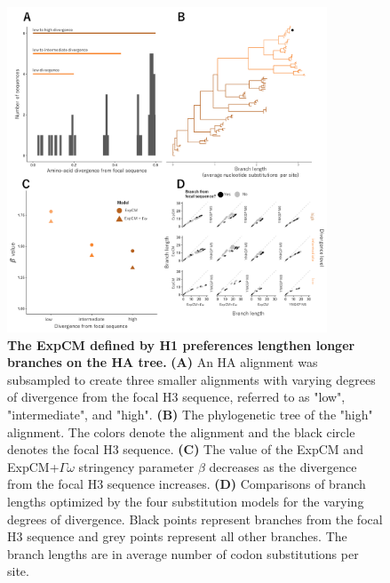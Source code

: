 \documentclass[11pt]{article}
\begin{document}
\begin{figure}
\centerline{\includegraphics[width=0.85\textwidth]{figures/experiment_lee}}
\caption{\label{fig:experiment_lee}
\textbf{The ExpCM defined by H1 preferences lengthen longer branches on the HA tree.} 
\textbf{(A)} An HA alignment was subsampled to create three smaller alignments with varying degrees of divergence from the focal H3 sequence, referred to as "low", "intermediate", and "high". 
\textbf{(B)} The phylogenetic tree of the "high" alignment. 
The colors denote the alignment and the black circle denotes the focal H3 sequence. 
\textbf{(C)} The value of the ExpCM and ExpCM+$\Gamma\omega$ stringency parameter $\beta$ decreases as the divergence from the focal H3 sequence increases. 
\textbf{(D)} Comparisons of branch lengths optimized by the four substitution models for the varying degrees of divergence. 
Black points represent branches from the focal H3 sequence and grey points represent all other branches.  
The branch lengths are in average number of codon substitutions per site. 
}
\end{figure}
\end{document}
